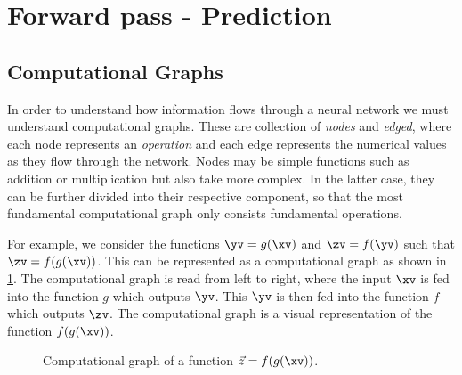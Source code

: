 %
%

\section{Forward pass - Prediction}
    \subsection{Computational Graphs}
    In order to understand how information flows through a neural network we must understand computational graphs. These are collection of \textit{nodes} and \textit{edged}, where each node represents an \textit{operation} and each edge represents the numerical values as they flow through the network. Nodes may be simple functions such as addition or multiplication but also take more complex. In the latter case, they can be further divided into their respective component, so that the most fundamental computational graph only consists fundamental operations. 

    For example, we consider the functions $\yv = g(\xv)$ and $\zv = f(\yv)$ such that $\zv = f(g(\xv))$. This can be represented as a computational graph as shown in \cref{fig:ML:NN:comp_graph_example}. The computational graph is read from left to right, where the input $\xv$ is fed into the function $g$ which outputs $\yv$. This $\yv$ is then fed into the function $f$ which outputs $\zv$. The computational graph is a visual representation of the function $f(g(\xv))$.

    \begin{figure}[h!]
        \centering
        
        \caption{Computational graph of a function $\vec{z} = f(g(\xv))$.}
        \label{fig:ML:NN:comp_graph_example}
    \end{figure}




    

